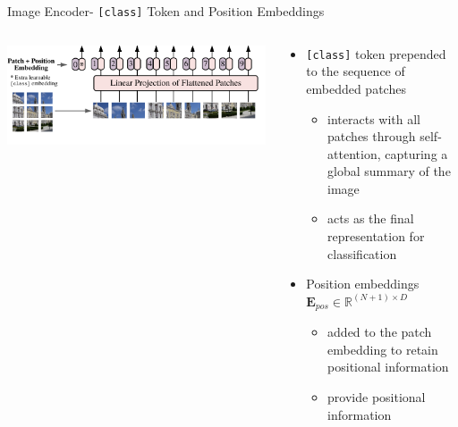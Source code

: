 \documentclass[aspectratio=169,xcolor=dvipsnames]{beamer}
\begin{document}
\begin{frame}{Image Encoder- \texttt{[class]} Token and Position Embeddings}

    \begin{columns}
        \begin{column}{0.5\textwidth}
        \includegraphics[width=\textwidth]{figures/patches_vision_transformer.png}
        \end{column}
        
        \begin{column}{0.5\textwidth}
        \begin{itemize}
            \item \texttt{[class]} token prepended to the sequence of embedded patches
            \begin{itemize}
                \item interacts with all patches through self-attention, capturing a global summary of the image
                \item acts as the final representation for classification
            \end{itemize}
            \medskip
            \item Position embeddings $\mathbf{E}_{p o s} \in \mathbb{R}^{(N+1) \times D}$
            \begin{itemize}
                \item added to the patch embedding to retain positional information
                \item provide positional information
            \end{itemize}
        \end{itemize}
    \end{column}
    \end{columns}
    \end{frame}
    
    
\end{document}

